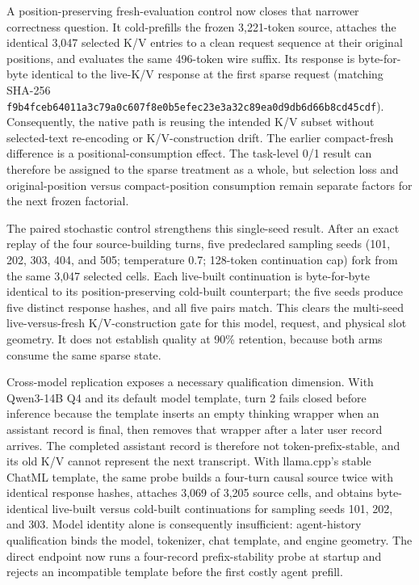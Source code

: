 \documentclass[11pt]{article}
\begin{document}
A position-preserving fresh-evaluation control now closes that narrower
correctness question.  It cold-prefills the frozen 3,221-token source, attaches
the identical 3,047 selected K/V entries to a clean request sequence at their
original positions, and evaluates the same 496-token wire suffix.  Its response
is byte-for-byte identical to the live-K/V response at the first sparse request
(matching SHA-256
\texttt{f9b4fceb64011a3c79a0c607f8e0b5efec23e3a32c89ea0d9db6d66b8cd45cdf}).
Consequently, the native path is reusing the intended K/V subset without
selected-text re-encoding or K/V-construction drift.  The earlier compact-fresh
difference is a positional-consumption effect.  The task-level 0/1 result can
therefore be assigned to the sparse treatment as a whole, but selection loss
and original-position versus compact-position consumption remain separate
factors for the next frozen factorial.

The paired stochastic control strengthens this single-seed result.  After an
exact replay of the four source-building turns, five predeclared sampling seeds
(101, 202, 303, 404, and 505; temperature 0.7; 128-token continuation cap) fork
from the same 3,047 selected cells.  Each live-built continuation is
byte-for-byte identical to its position-preserving cold-built counterpart;
the five seeds produce five distinct response hashes, and all five pairs match.
This clears the multi-seed live-versus-fresh K/V-construction gate for this
model, request, and physical slot geometry.  It does not establish quality at
90\% retention, because both arms consume the same sparse state.

Cross-model replication exposes a necessary qualification dimension.  With
Qwen3-14B Q4 and its default model template, turn 2 fails closed before
inference because the template inserts an empty thinking wrapper when an
assistant record is final, then removes that wrapper after a later user record
arrives.  The completed assistant record is therefore not token-prefix-stable,
and its old K/V cannot represent the next transcript.  With llama.cpp's stable
ChatML template, the same probe builds a four-turn causal source twice with
identical response hashes, attaches 3,069 of 3,205 source cells, and obtains
byte-identical live-built versus cold-built continuations for sampling seeds
101, 202, and 303.  Model identity alone is consequently insufficient:
agent-history qualification binds the model, tokenizer, chat template, and
engine geometry.  The direct endpoint now runs a four-record prefix-stability
probe at startup and rejects an incompatible template before the first costly
agent prefill.
\end{document}
